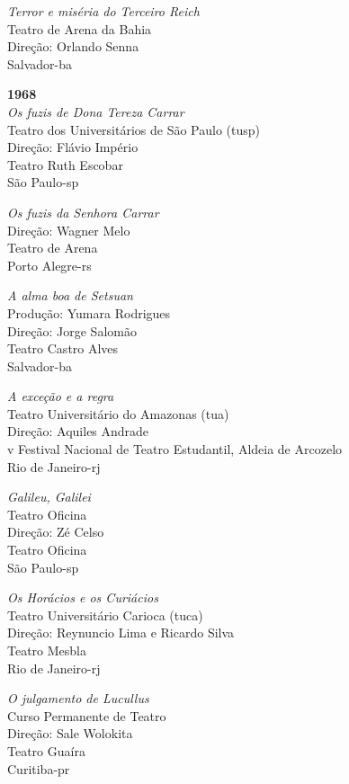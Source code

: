 {\it Terror e miséria do Terceiro Reich}\\
Teatro de Arena da Bahia\\
Direção: Orlando Senna\\
Salvador-{\sc ba}

\item{\bf 1968}\\
{\it Os fuzis de Dona Tereza Carrar}\\
Teatro dos Universitários de São Paulo ({\sc tusp})\\
Direção: Flávio Império\\
Teatro Ruth Escobar\\
São Paulo-{\sc sp}

{\it Os fuzis da Senhora Carrar}\\
Direção: Wagner Melo\\
Teatro de Arena\\
Porto Alegre-{\sc rs}

{\it A alma boa de Setsuan}\\
Produção: Yumara Rodrigues\\
Direção: Jorge Salomão\\
Teatro Castro Alves\\
Salvador-{\sc ba}

{\it A exceção e a regra}\\
Teatro Universitário do Amazonas ({\sc tua})\\
Direção: Aquiles Andrade\\
{\sc v} Festival Nacional de Teatro Estudantil, Aldeia de Arcozelo\\
Rio de Janeiro-{\sc rj}

{\it Galileu, Galilei}\\
Teatro Oficina\\
Direção: Zé Celso\\
Teatro Oficina\\
São Paulo-{\sc sp}

{\it Os Horácios e os Curiácios}\\
Teatro Universitário Carioca ({\sc tuca})\\
Direção: Reynuncio Lima e Ricardo Silva\\
Teatro Mesbla\\
Rio de Janeiro-{\sc rj}

{\it O julgamento de Lucullus}\\
Curso Permanente de Teatro\\
Direção: Sale Wolokita\\
Teatro Guaíra\\
Curitiba-{\sc pr}
\stopitemize


